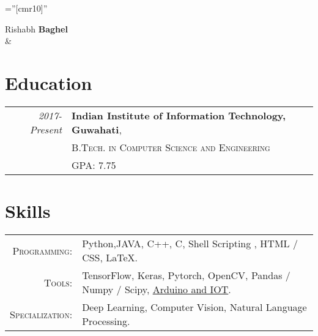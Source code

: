 \documentclass[a4paper,5pt]{article}
\begin{document}
\pagestyle{empty} %

\font\fb=''[cmr10]'' %

\par{\centering
		{\Huge Rishabh \textbf{Baghel}
	}\\
	&
	
	\bigskip\par}

\section{Education}
\begin{tabular}{rl}	
 \emph{2017-Present} &  \textbf{Indian Institute of Information Technology, Guwahati},\\
&\textsc{B.Tech. in Computer Science and Engineering }\\
&\footnotesize{GPA: 7.75}\\

\end{tabular}



\section{Skills}

\begin{tabular}{rl}
    \textsc{Programming:} & Python,\space JAVA, C++, C, Shell Scripting , HTML / CSS, \LaTeX.  
    \vspace{0.0625cm}\\
    \textsc{Tools:}   & TensorFlow, Keras, Pytorch, OpenCV,  Pandas / Numpy / Scipy, \href{https://drive.google.com/open?id=1ojBHtMhwjCHly8aPzV19NOi9QXrqYnj_}{Arduino and IOT}. 
    \vspace{0.0625cm}\\
    \textsc{Specialization:}     & Deep Learning, Computer Vision, Natural Language Processing.
    
\end{tabular}
\end{document}
